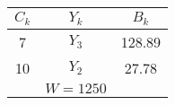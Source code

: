     \begin{tabular}{ccc}
    \hline
    \hline
    $C_k$   & $Y_k$   & $B_k$ \bigstrut\\
    \hline
    7       & $Y_3$   & 128.89 \bigstrut[t]\\
    10      & $Y_2$   & 27.78 \bigstrut[b]\\
    \hline
            & $W=1250$ &  \bigstrut\\
    \hline
    \hline
    \end{tabular}%
